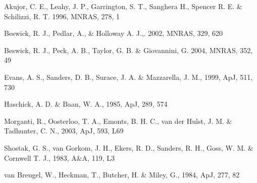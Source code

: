 \documentclass{evn2004}
\begin{document}
\begin{thebibliography}{}

	 Akujor, C. E., Leahy, J. P.,
Garrington, S. T., Sanghera H., Spencer R. E. \& Schilizzi,
R. T. 1996, MNRAS, 278, 1

   Beswick, R. J., Pedlar, A., \& Holloway
A. J.,. 2002, MNRAS, 329, 620

    Beswick, R. J., Peck, A. B., Taylor,
G. B. \& Giovannini, G. 2004,
      MNRAS, 352, 49

  Evans, A. S., Sanders, D. B., Surace,
J. A. \& Mazzarella, J. M., 1999, ApJ, 511, 730
 
    Haschick, A. D. \& Baan, W. A., 1985, ApJ, 289, 574
   
 Morganti, R., Oosterloo, T. A., Emonts,
B. H. C., van der Hulst, J. M. \& Tadhunter, C. N., 2003, ApJ, 593, L69

 Shostak, G. S., van Gorkom, J. H., Ekers,
R. D., Sanders, R. H., Goss, W. M. \& Cornwell T. J., 1983, A\&A, 119,
L3

 van Breugel, W., Heckman, T., Butcher, H. \&
Miley, G., 1984, ApJ, 277, 82


\end{thebibliography}
\end{document}
